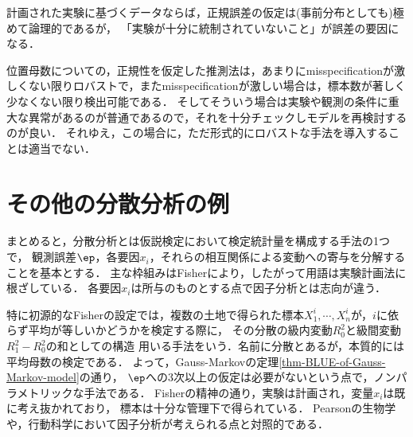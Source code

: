 \documentclass[uplatex,dvipdfmx]{jsreport}
\begin{document}
\begin{tcolorbox}[colframe=ForestGreen, colback=ForestGreen!10!white,breakable,colbacktitle=ForestGreen!40!white,coltitle=black,fonttitle=\bfseries\sffamily,
title=]
    計画された実験に基づくデータならば，正規誤差の仮定は(事前分布としても)極めて論理的であるが，
    「実験が十分に統制されていないこと」が誤差の要因になる．
\end{tcolorbox}

\begin{remarks}
    位置母数についての，正規性を仮定した推測法は，あまりにmisspecificationが激しくない限りロバストで，またmisspecificationが激しい場合は，標本数が著しく少なくない限り検出可能である．
    そしてそういう場合は実験や観測の条件に重大な異常があるのが普通であるので，それを十分チェックしモデルを再検討するのが良い．
    それゆえ，この場合に，ただ形式的にロバストな手法を導入することは適当でない．
\end{remarks}

\section{その他の分散分析の例}

\begin{tcolorbox}[colframe=ForestGreen, colback=ForestGreen!10!white,breakable,colbacktitle=ForestGreen!40!white,coltitle=black,fonttitle=\bfseries\sffamily,
title=]
    まとめると，分散分析とは仮説検定において検定統計量を構成する手法の1つで，
    観測誤差$\ep$，各要因$x_i$，それらの相互関係による変動への寄与を分解することを基本とする．
    主な枠組みはFisherにより，したがって用語は実験計画法に根ざしている．
    各要因$x_i$は所与のものとする点で因子分析とは志向が違う．
\end{tcolorbox}

\begin{remarks}
    特に初源的なFisherの設定では，複数の土地で得られた標本$X^i_1,\cdots,X^i_n$が，$i$に依らず平均が等しいかどうかを検定する際に，
    その分散の級内変動$R_0^2$と級間変動$R_1^2-R_0^2$の和としての構造
    用いる手法をいう．名前に分散とあるが，本質的には平均母数の検定である．
    よって，Gauss-Markovの定理\ref{thm-BLUE-of-Gauss-Markov-model}の通り，
    $\ep$への3次以上の仮定は必要がないという点で，ノンパラメトリックな手法である．
    Fisherの精神の通り，実験は計画され，変量$x_i$は既に考え抜かれており，
    標本は十分な管理下で得られている．
    Pearsonの生物学や，行動科学において因子分析が考えられる点と対照的である．
\end{remarks}
\end{document}
